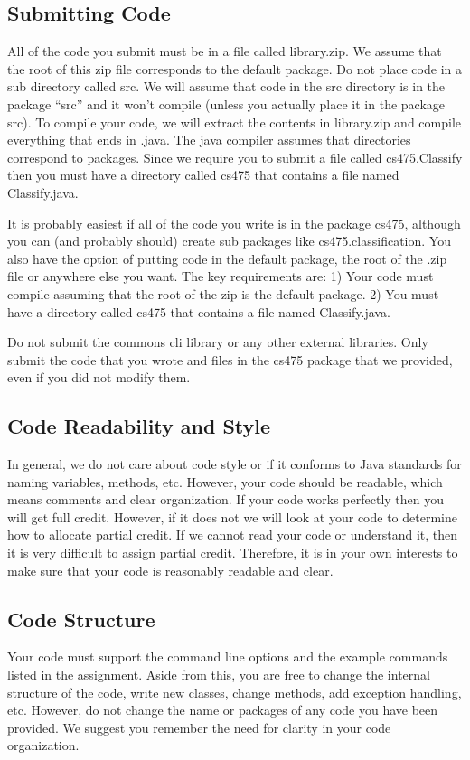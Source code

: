 \documentclass[11pt]{article}
\begin{document}
\subsection{Submitting Code}
All of the code you submit must be in a file called library.zip. We assume that the root of this zip file corresponds to the default package. Do not place code in a sub directory called src. We will assume that code in the src directory is in the package ``src'' and it won't compile (unless you actually place it in the package src). To compile your code, we will extract the contents in library.zip and compile everything that ends in .java. The java compiler assumes that directories correspond to packages. Since we require you to submit a file called cs475.Classify then you must have a directory called cs475 that contains a file named Classify.java.

It is probably easiest if all of the code you write is in the package cs475, although you can (and probably should) create sub packages like cs475.classification. You also have the option of putting code in the default package, the root of the .zip file or anywhere else you want. The key requirements are:
1) Your code must compile assuming that the root of the zip is the default package.
2) You must have a directory called cs475 that contains a file named Classify.java.

Do not submit the commons cli library or any other external libraries. Only submit  the code that you wrote and files in the cs475 package that we provided, even if you did not modify them.

\subsection{Code Readability and Style}
In general, we do not care about code style or if it conforms to Java standards for naming variables, methods, etc. However, your code should be readable, which means comments and clear organization. If your code works perfectly then you will get full credit. However, if it does not we will look at your code to determine how to allocate partial credit. If we cannot read your code or understand it, then it is very difficult to assign partial credit. Therefore, it is in your own interests to make sure that your code is reasonably readable and clear.

\subsection{Code Structure}
Your code must support the command line options and the example commands listed in the assignment. Aside from this, you are free to change the internal structure of the code, write new classes, change methods, add exception handling, etc. However, do not change the name or packages of any code you have been provided. We suggest you remember the need for clarity in your code organization.
\end{document}
